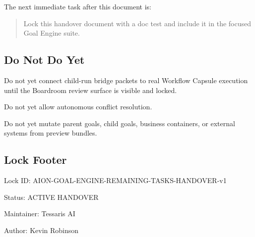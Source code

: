 The next immediate task after this document is:

\begin{quote}
Lock this handover document with a doc test and include it in the focused Goal Engine suite.
\end{quote}

\subsection{Do Not Do Yet}

Do not yet connect child-run bridge packets to real Workflow Capsule execution until the Boardroom review surface is visible and locked.

Do not yet allow autonomous conflict resolution.

Do not yet mutate parent goals, child goals, business containers, or external systems from preview bundles.

\subsection{Lock Footer}

Lock ID: AION-GOAL-ENGINE-REMAINING-TASKS-HANDOVER-v1

Status: ACTIVE HANDOVER

Maintainer: Tessaris AI

Author: Kevin Robinson
